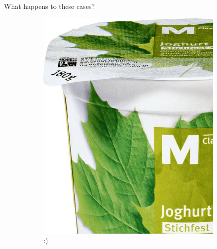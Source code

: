 \documentclass{beamer}
\begin{document}
\begin{frame}{What happens to these cases?}
\begin{figure}[H]
\begin{subfigure}{.32\textwidth}
		\includegraphics[width=\textwidth]{m-classic-joghurt-ahornsirup-stichfest-zoom2}
		\pause
		:)
	\end{subfigure}\pause
	\begin{subfigure}{.32\textwidth}
		\centering

\end{subfigure}
\end{figure}
\end{frame}
\end{document}
